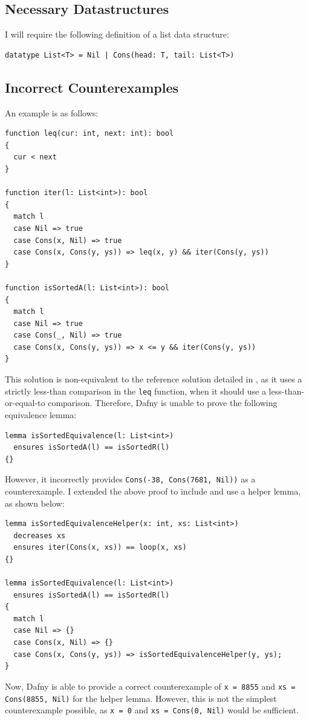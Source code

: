 \documentclass[a4paper, 11pt]{article}
\begin{document}
\subsection{Necessary Datastructures}

I will require the following definition of a list data structure:
\begin{lstlisting}[caption=List Data Structure]
datatype List<T> = Nil | Cons(head: T, tail: List<T>)
\end{lstlisting}

\subsection{Incorrect Counterexamples}

An example is as follows:
\begin{lstlisting}[caption=\lstinline|isSortedA| Function]
function leq(cur: int, next: int): bool
{
  cur < next
}

function iter(l: List<int>): bool
{
  match l
  case Nil => true
  case Cons(x, Nil) => true
  case Cons(x, Cons(y, ys)) => leq(x, y) && iter(Cons(y, ys))
}

function isSortedA(l: List<int>): bool
{
  match l
  case Nil => true
  case Cons(_, Nil) => true
  case Cons(x, Cons(y, ys)) => x <= y && iter(Cons(y, ys))
}
\end{lstlisting}
%
This solution is non-equivalent to the reference solution detailed in , as it uses a strictly less-than comparison in the \lstinline|leq| function, when it should use a less-than-or-equal-to comparison. Therefore, Dafny is unable to prove the following equivalence lemma:
\begin{lstlisting}[caption=Equivalence Lemma for \lstinline|isSortedA| and \lstinline|isSortedR|]
lemma isSortedEquivalence(l: List<int>)
  ensures isSortedA(l) == isSortedR(l)
{}
\end{lstlisting}
%
However, it incorrectly provides \lstinline|Cons(-38, Cons(7681, Nil))| as a counterexample. I extended the above proof to include and use a helper lemma, as shown below:
\begin{lstlisting}[caption=Equivalence Lemma with Helper for \lstinline|isSortedA| and \lstinline|isSortedR|]
lemma isSortedEquivalenceHelper(x: int, xs: List<int>)
  decreases xs
  ensures iter(Cons(x, xs)) == loop(x, xs)
{}

lemma isSortedEquivalence(l: List<int>)
  ensures isSortedA(l) == isSortedR(l)
{
  match l
  case Nil => {}
  case Cons(x, Nil) => {}
  case Cons(x, Cons(y, ys)) => isSortedEquivalenceHelper(y, ys);
}
\end{lstlisting}
%
Now, Dafny is able to provide a correct counterexample of \lstinline|x = 8855| and \lstinline|xs = Cons(8855, Nil)| for the helper lemma. However, this is not the simplest counterexample possible, as \lstinline|x = 0| and \lstinline|xs = Cons(0, Nil)| would be sufficient.
\end{document}
